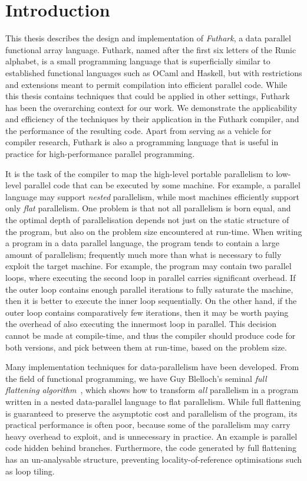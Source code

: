 \chapter{Introduction}

This thesis describes the design and implementation of
\textit{Futhark}, a data parallel functional array language.  Futhark,
named after the first six letters of the Runic alphabet, is a small
programming language that is superficially similar to established
functional languages such as OCaml and Haskell, but with restrictions
and extensions meant to permit compilation into efficient parallel
code.  While this thesis contains techniques that could be applied in
other settings, Futhark has been the overarching context for our work.
We demonstrate the applicability and efficiency of the techniques by
their application in the Futhark compiler, and the performance of the
resulting code.  Apart from serving as a vehicle for compiler
research, Futhark is also a programming language that is useful in
practice for high-performance parallel programming.

It is the task of the compiler to map the high-level portable
parallelism to low-level parallel code that can be executed by some
machine.  For example, a parallel language may support \textit{nested}
parallelism, while most machines efficiently support only
\textit{flat} parallelism.  One problem is that not all parallelism is
born equal, and the optimal depth of parallelisation depends not just
on the static structure of the program, but also on the problem size
encountered at run-time.  When writing a program in a data parallel
language, the program tends to contain a large amount of parallelism;
frequently much more than what is necessary to fully exploit the
target machine.  For example, the program may contain two parallel
loops, where executing the second loop in parallel carries significant
overhead.  If the outer loop contains enough parallel iterations to
fully saturate the machine, then it is better to execute the inner
loop sequentially.  On the other hand, if the outer loop contains
comparatively few iterations, then it may be worth paying the overhead
of also executing the innermost loop in parallel.  This decision
cannot be made at compile-time, and thus the compiler should produce
code for both versions, and pick between them at run-time, based on
the problem size.

Many implementation techniques for data-parallelism have been
developed.  From the field of functional programming, we have Guy
Blelloch's seminal \textit{full flattening
  algorithm}~\cite{blelloch1994implementation}, which shows how to
transform \textit{all} parallelism in a program written in a nested
data-parallel language to flat parallelism.  While full flattening is
guaranteed to preserve the asymptotic cost and parallelism of the
program, its practical performance is often poor, because some of the
parallelism may carry heavy overhead to exploit, and is unnecessary in
practice.  An example is parallel code hidden behind branches.
Furthermore, the code generated by full flattening has an
un-analysable structure, preventing locality-of-reference
optimisations such as loop tiling.

